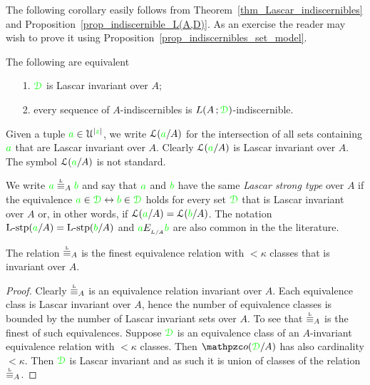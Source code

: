 \documentclass[creche.tex]{subfiles}
\begin{document}
The following corollary easily follows from Theorem~\ref{thm_Lascar_indiscernibles} and Proposition~\ref{prop_indiscernible_L(A,D)}. As an exercise the reader may wish to prove it using Proposition~\ref{prop_indiscernibles_set_model}.
 
\begin{corollary}
The following are equivalent
\begin{itemize}
\item[1.] ${\color{green}\EuScript D}$ is Lascar invariant over $A$;
\item[2.] every sequence of $A$-indiscernibles is $L(A\,;{\color{green}\EuScript D})$-indiscernible.\QED
\end{itemize}
\end{corollary}

\noindent\llap{\textcolor{red}{\Large\danger}
\kern1.5ex}Given a tuple ${\color{green} a}\in\EuScript U^{|{\color{green} z}|}$, we write \emph{$\EuScript L({\color{green} a}/A)$\/} for the intersection of all sets containing ${\color{green} a}$ that are Lascar invariant over $A$. Clearly $\EuScript L({\color{green} a}/A)$ is Lascar invariant over $A$. The symbol $\EuScript L({\color{green} a}/A)$ is not standard.

\begin{definition}\label{def_Lascar_type}We write \emph{${\gr a}\stackrel{\smash{\scalebox{.5}{\rm L}}}{\equiv}_A{\gr b}$\/} and say that ${\color{green} a}$ and ${\color{green} b}$ have the same \emph{Lascar strong type\/} over $A$ if the equivalence ${\color{green} a}\in{\color{green}\EuScript D}\leftrightarrow{\color{green}b}\in{\color{green}\EuScript D}$ holds for every set ${\color{green}\EuScript D}$ that is Lascar invariant over $A$ or, in other words, if $\EuScript L({\color{green} a}/A)=\EuScript L({\color{green} b}/A)$. The notation ${\rm L{\mbox{-}}stp}({\color{green} a}/A)={\rm L{\mbox{-}}stp}({\color{green} b}/A)$ and ${\color{green} a}E_{_{L/A}}{\color{green} b}$ are also common in the the literature.\QED
\end{definition}

\begin{proposition}
  The relation $\equivL_A$ is the finest equivalence relation with $<\kappa$ classes that is invariant over $A$.\QED
\end{proposition}

\begin{proof}
  Clearly $\equivL_A$ is an equivalence relation invariant over $A$. Each equivalence class is Lascar invariant over $A$, hence the number of equivalence classes is bounded by the number of Lascar invariant sets over $A$. To see that $\equivL_A$ is the finest of such equivalences. Suppose ${\color{green}\EuScript D}$ is an equivalence class of an $A$-invariant equivalence relation with $<\kappa$ classes. Then $\oorbit(\grD/A)$ has also cardinality $<\kappa$. Then ${\color{green}\EuScript D}$ is Lascar invariant and as such it is union of classes of the relation $\equivL_A$. 
\end{proof}
\end{document}
